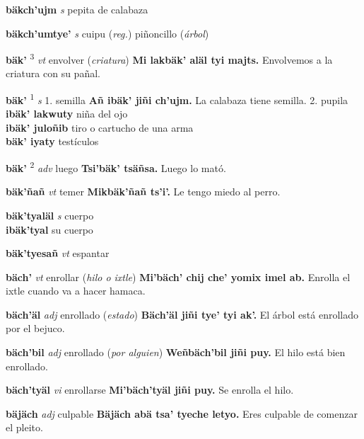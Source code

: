 \documentclass[10pt]{scrbook}
\newcommand{\entry}[1]{\textbf{#1}}
\newcommand{\onedefinition}[1]{#1.}
\newcommand{\defsuperscript}[1]{\textsuperscript{#1}}
\newcommand{\partofspeech}[1]{\textit{#1}}
\newcommand{\spanishtranslation}[1]{#1}
\newcommand{\clarification}[1]{(\textit{#1})}
\newcommand{\cholexample}[1]{\textbf{#1}}
\newcommand{\exampletranslation}[1]{#1}
\newcommand{\secondaryentry}[1]{\\\textbf{#1}}
\newcommand{\secondtranslation}[1]{#1}
\begin{document}
\begin{multicols}{2}
\entry{bäkch'ujm}
\partofspeech{s}
\spanishtranslation{pepita de calabaza}

\entry{bäkch'umtye'}
\partofspeech{s}
\spanishtranslation{cuipu}
\clarification{reg.}
\spanishtranslation{piñoncillo}
\clarification{árbol}

\entry{bäk'}
\defsuperscript{3}
\partofspeech{vt}
\spanishtranslation{envolver}
\clarification{criatura}
\cholexample{Mi lakbäk' aläl tyi majts.}
\exampletranslation{Envolvemos a la criatura con su pañal.}

\entry{bäk'}
\defsuperscript{1}
\partofspeech{s}
\onedefinition{1}
\spanishtranslation{semilla}
\cholexample{Añ ibäk' jiñi ch'ujm.}
\exampletranslation{La calabaza tiene semilla.}
\onedefinition{2}
\spanishtranslation{pupila}
\secondaryentry{ibäk' lakwuty}
\secondtranslation{niña del ojo}
\secondaryentry{ibäk' juloñib}
\secondtranslation{tiro o cartucho de una arma}
\secondaryentry{bäk' iyaty}
\secondtranslation{testículos}

\entry{bäk'}
\defsuperscript{2}
\partofspeech{adv}
\spanishtranslation{luego}
\cholexample{Tsi'bäk' tsäñsa.}
\exampletranslation{Luego lo mató.}

\entry{bäk'ñañ}
\partofspeech{vt}
\spanishtranslation{temer}
\cholexample{Mikbäk'ñañ ts'i'.}
\exampletranslation{Le tengo miedo al perro.}

\entry{bäk'tyaläl}
\partofspeech{s}
\spanishtranslation{cuerpo}
\secondaryentry{ibäk'tyal}
\secondtranslation{su cuerpo}

\entry{bäk'tyesañ}
\partofspeech{vt}
\spanishtranslation{espantar}

\entry{bäch'}
\partofspeech{vt}
\spanishtranslation{enrollar}
\clarification{hilo o ixtle}
\cholexample{Mi'bäch' chij che' yomix imel ab.}
\exampletranslation{Enrolla el ixtle cuando va a hacer hamaca.}

\entry{bäch'äl}
\partofspeech{adj}
\spanishtranslation{enrollado}
\clarification{estado}
\cholexample{Bäch'äl jiñi tye' tyi ak'.}
\exampletranslation{El árbol está enrollado por el bejuco.}

\entry{bäch'bil}
\partofspeech{adj}
\spanishtranslation{enrollado}
\clarification{por alguien}
\cholexample{Weñbäch'bil jiñi puy.}
\exampletranslation{El hilo está bien enrollado.}

\entry{bäch'tyäl}
\partofspeech{vi}
\spanishtranslation{enrollarse}
\cholexample{Mi'bäch'tyäl jiñi puy.}
\exampletranslation{Se enrolla el hilo.}

\entry{bäjäch}
\partofspeech{adj}
\spanishtranslation{culpable}
\cholexample{Bäjäch abä tsa' tyeche letyo.}
\exampletranslation{Eres culpable de comenzar el pleito.}


\end{multicols}
\end{document}
